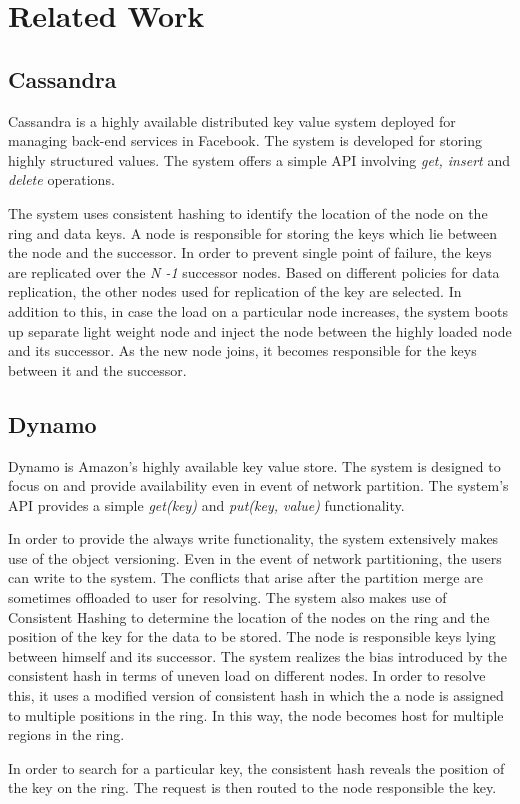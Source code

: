 \documentclass[12pt,a4paper,twoside,openright]{book}
\begin{document}
\chapter{Related Work}
\label{chap:related_work}



\section{Cassandra}
Cassandra \cite{cassandra} is a highly available distributed key value system deployed for managing back-end services in Facebook. The system is developed for storing highly structured values. The system offers a simple API involving \textit{get, insert} and \textit{delete} operations.
\par The system uses consistent hashing to identify the location of the node on the ring and data keys. A node is responsible for storing the keys which lie between the node and the successor. In order to prevent single point of failure, the keys are replicated over the \textit{N -1} successor nodes. Based on different policies for data replication, the other nodes used for replication of the key are selected. In addition to this, in case the load on a particular node increases, the system boots up separate light weight node and inject the node between the highly loaded node and its successor. As the new node joins, it becomes responsible for the keys between it and the successor.

\section{Dynamo}
Dynamo \cite{dynamo} is Amazon's highly available key value store. The system is designed to focus on and provide availability even in event of network partition. The system's API provides a simple \textit{get(key)} and \textit{put(key, value)} functionality. 

\par In order to provide the always write functionality, the system extensively makes use of the object versioning. Even in the event of network partitioning, the users can write to the system. The conflicts that arise after the partition merge are sometimes offloaded to user for resolving. The system also makes use of Consistent Hashing to determine the location of the nodes on the ring and the position of the key for the data to be stored. The node is responsible keys lying between himself and its successor. The system realizes the bias introduced by the consistent hash in terms of uneven load on different nodes. In order to resolve this, it uses a modified version of consistent hash in which the a node is assigned to multiple positions in the ring. In this way, the node becomes host for multiple regions in the ring.
\par In order to search for a particular key, the consistent hash reveals the position of the key on the ring. The request is then routed to the node responsible the key. 
\end{document}
